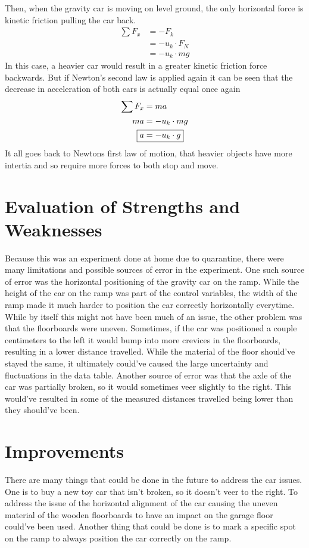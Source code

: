 \documentclass[12pt]{article}
\begin{document}
Then, when the gravity car is moving on level ground, the only horizontal force is kinetic friction pulling the car back. 
\begin{align*}
	\sum F_{x}&=-F_{k} \\
&=-u_{k}\cdot F_{N} \\
&=-u_{k}\cdot mg
\end{align*}
In this case, a heavier car would result in a greater kinetic friction force backwards. But if Newton's second law is applied again it can be seen that the decrease in acceleration of both cars is actually equal once again
\begin{align*}
\sum F_{x}&=ma\\
ma&=-u_{k}\cdot mg\\
\Aboxed{a&=-u_{k}\cdot g}
\end{align*}
It all goes back to Newtons first law of motion, that heavier objects have more intertia and so require more forces to both stop and move. 

\section{Evaluation of Strengths and Weaknesses}
Because this was an experiment done at home due to quarantine, there were many limitations and possible sources of error in the experiment. One such source of error was the horizontal positioning of the gravity car on the ramp. While the height of the car on the ramp was part of the control variables, the width of the ramp made it much harder to position the car correctly horizontally everytime. While by itself this might not have been much of an issue, the other problem was that the floorboards were uneven. Sometimes, if the car was positioned a couple centimeters to the left it would bump into more crevices in the floorboards, resulting in a lower distance travelled. While the material of the floor should've stayed the same, it ultimately could've caused the large uncertainty and fluctuations in the data table. Another source of error was that the axle of the car was partially broken, so it would sometimes veer slightly to the right. This would've resulted in some of the measured distances travelled being lower than they should've been.

\section{Improvements}
There are many things that could be done in the future to address the car issues. One is to buy a new toy car that isn't broken, so it doesn't veer to the right. To address the issue of the horizontal alignment of the car causing the uneven material of the wooden floorboards to have an impact on the garage floor could've been used. Another thing that could be done is to mark a specific spot on the ramp to always position the car correctly on the ramp. 
\end{document}
